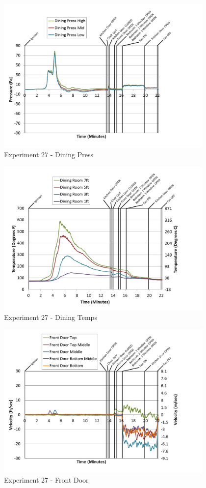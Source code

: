 \documentclass{article}
\begin{document}
\begin{appendices}
\clearpage

\begin{figure}[h!]
	\centering
	\includegraphics[height=3.05in]{0_Images/Results_Charts/Exp_27_Charts/DiningPress.png}
	\caption{Experiment 27 - Dining Press}
\end{figure}


\begin{figure}[h!]
	\centering
	\includegraphics[height=3.05in]{0_Images/Results_Charts/Exp_27_Charts/DiningTemps.png}
	\caption{Experiment 27 - Dining Temps}
\end{figure}

\clearpage

\begin{figure}[h!]
	\centering
	\includegraphics[height=3.05in]{0_Images/Results_Charts/Exp_27_Charts/FrontDoor.png}
	\caption{Experiment 27 - Front Door}
\end{figure}



\end{appendices}
\end{document}

